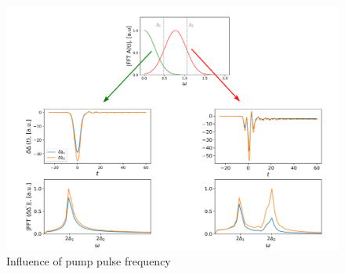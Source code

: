 \documentclass[aps,prb,reprint,noeprint,superscriptaddress]{revtex4-1}
\begin{document}
\begin{figure}[H]
    \centering
    \includegraphics[width=\columnwidth]{figures/influence_pump_pulse_freq.png}
    \caption{\label{fig:influence_pump_pulse_freq}%
    Influence of pump pulse frequency}
\end{figure}%
\end{document}

